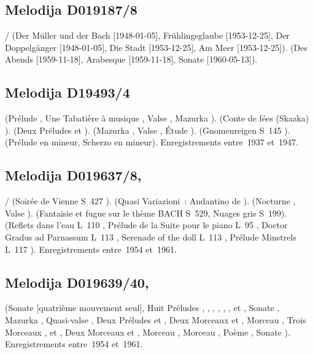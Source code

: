 \subsection{Melodija D019187/8}

\Schubert{}/\Liszt{} (Der Müller und der Bach [1948-01-05], Frühlingsglaube
[1953-12-25], Der Doppelgänger [1948-01-05], Die Stadt [1953-12-25], Am Meer
[1953-12-25]).
\Schumann{} (Des Abends   [1959-11-18], Arabesque
 [1959-11-18], Sonate  [1960-05-13]).

\subsection{Melodija D19493/4}

\Liadov{} (Prélude  , Une Tabatière à musique ,
Valse  , Mazurka  ).
\Medtner{} (Conte de fées (Skazka)  ).
\Scriabine{} (Deux Préludes   et  ).
\Chopin{} (Mazurka  , Valse  , Étude
 ).
\Liszt{} (Gnomenreigen S~145 ).
\Goltz{} (Prélude en \kE mineur, Scherzo en \kE mineur).
Enregistrements entre~1937 et~1947.

\subsection{Melodija D019637/8, }

\Schubert{}/\Liszt{} (Soirée de Vienne  S~427 ).
\Schumann{} (Quasi Variazioni~: Andantino de \CWieck{} ).
\Chopin{} (Nocturne  , Valse  ).
\Liszt{} (Fantaisie et fugue sur le thème BACH S~529, Nuages gris S~199).
\Debussy{} (Reflets dans l'eau L~110 , Prélude de la Suite pour le
piano L~95 , Doctor Gradus ad Parnassum L~113 , Serenade
of the doll L~113 , Prélude Minstrels L~117 ).
Enregistrements entre~1954 et~1961.

\subsection{Melodija D019639/40, }

\Scriabine{} (Sonate  [quatrième mouvement seul], Huit Préludes
 ,  ,  , 
,  ,  , 
 et  , Sonate , Mazurka 
, Quasi-valse , Deux Préludes   et
 , Deux Morceaux   et 
, Morceau  , Trois Morceaux 
,   et  , Deux Morceaux
  et  , Morceau  ,
Morceau  , Poème  , Sonate ).
Enregistrements entre~1954 et~1961.

